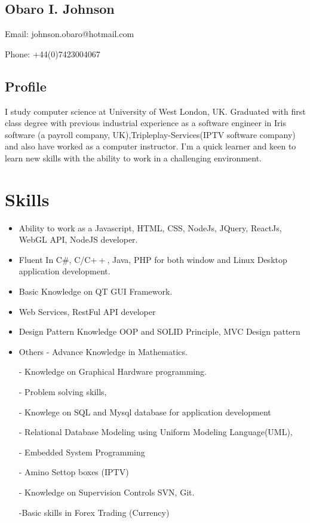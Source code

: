 \documentclass[11px]{article}
\begin{document}
	\begin{center}
	\section*{Obaro I. Johnson}
	Email: johnson.obaro@hotmail.com
	
    Phone: $+$44(0)7423004067
    \end{center}
   \makebox[\linewidth]{\rule{\paperwidth}{0.1pt}}
	
	\subsection*{Profile}
	I study computer science at University of West London, UK. Graduated with first class degree with previous industrial experience as a software engineer in  Iris software  (a payroll company, UK),Tripleplay-Services(IPTV software company) and also have worked as a computer instructor. I'm a quick learner and keen to learn new skills with the ability to work in a challenging environment. 
	
\section*{Skills}
 \begin{itemize}
 	\item Ability to work as a Javascript, HTML, CSS, NodeJs, JQuery, ReactJs,  WebGL API, NodeJS developer.
 	 
 	\item Fluent In C\#,  C/C$++$, Java, PHP for both window and Linux Desktop application development.
 	\item Basic Knowledge on QT GUI Framework.
 	
 	\item Web Services, RestFul API developer
 	   
 	\item Design Pattern
 	     Knowledge OOP and SOLID Principle, 	     
 	     MVC Design pattern
 	\item Others 	
 	  - Advance Knowledge in Mathematics.
 	  
 	  - Knowledge on Graphical Hardware programming.
 	  
 	  - Problem solving skills,
 	  
 	  - Knowlege on SQL and  Mysql  database for application development
 	  
 	  - Relational Database Modeling using Uniform Modeling Language(UML),
 	 
 	  - Embedded System Programming 
 	 
	 	 -  Amino Settop boxes (IPTV)
	 	 
	 	 - Knowledge on Supervision Controls SVN, Git.
	 	 
	 -Basic skills in Forex Trading (Currency) 
 	 	  
 \end{itemize}
 \hrulefill
 
\end{document}
